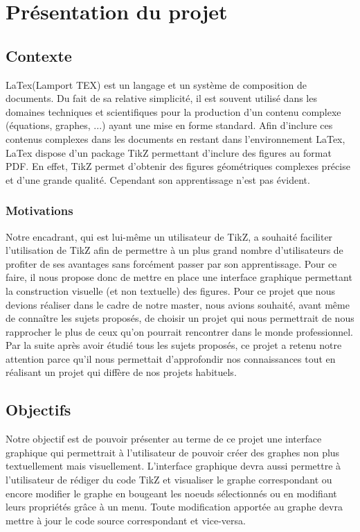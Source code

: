 \documentclass[a4paper]{report}
\begin{document}
  \chapter{Présentation du projet}
  \section{Contexte}
  LaTex(Lamport TEX) est un langage et un système de composition de documents. Du fait de sa relative simplicité, il est souvent utilisé dans les domaines techniques et scientifiques pour la production d'un contenu complexe (équations, graphes, ...) ayant une mise en forme standard. Afin d'inclure ces contenus complexes dans les documents en restant dans l'environnement LaTex, LaTex dispose d'un package TikZ permettant d'inclure des figures au format PDF. En effet, TikZ permet d'obtenir des figures géométriques complexes précise et d'une grande qualité. Cependant son apprentissage n'est pas évident. 
  \subsection{Motivations}
  Notre encadrant, qui est lui-même un utilisateur de TikZ, a souhaité faciliter l'utilisation de TikZ afin de permettre à un plus grand nombre d'utilisateurs de profiter de ses avantages sans forcément passer par son apprentissage. Pour ce faire, il nous propose donc de mettre en place une interface graphique permettant la construction  visuelle (et non textuelle) des figures.
  \newline
  Pour ce projet que nous devions réaliser dans le cadre de notre master, nous avions souhaité, avant même de 
connaître les sujets proposés, de choisir un projet qui nous permettrait de nous rapprocher le plus de ceux qu'on pourrait rencontrer dans le monde professionnel. Par la suite après avoir étudié tous les sujets proposés, ce projet a retenu notre attention parce qu'il nous permettait d'approfondir nos connaissances tout en réalisant un projet qui diffère de nos projets habituels.
  \section{Objectifs}
  Notre objectif est de pouvoir présenter au terme de ce projet une interface graphique qui permettrait à l'utilisateur de pouvoir créer des graphes non plus textuellement mais visuellement. L'interface graphique devra aussi permettre à l'utilisateur de rédiger du code TikZ et visualiser le graphe correspondant ou encore modifier le graphe en bougeant les noeuds sélectionnés ou en modifiant leurs propriétés grâce à un menu.
Toute modification apportée au graphe devra mettre à jour le code source correspondant et vice-versa. 
\end{document}
